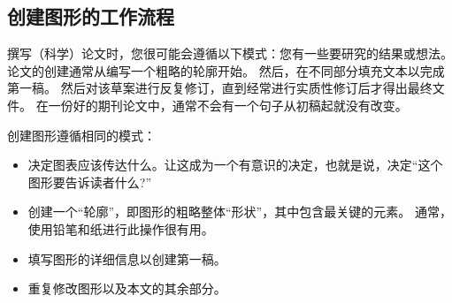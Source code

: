 \subsection{创建图形的工作流程}


撰写（科学）论文时，您很可能会遵循以下模式：您有一些要研究的结果或想法。 论文的创建通常从编写一个粗略的轮廓开始。 然后，在不同部分填充文本以完成第一稿。 然后对该草案进行反复修订，直到经常进行实质性修订后才得出最终文件。 在一份好的期刊论文中，通常不会有一个句子从初稿起就没有改变。


创建图形遵循相同的模式：

%
\begin{itemize}
    \item 决定图表应该传达什么。让这成为一个有意识的决定，也就是说，决定``这个图形要告诉读者什么?''
    \item 创建一个``轮廓''，即图形的粗略整体``形状''，其中包含最关键的元素。 通常，使用铅笔和纸进行此操作很有用。
    \item 填写图形的详细信息以创建第一稿。
    \item 重复修改图形以及本文的其余部分。
\end{itemize}


